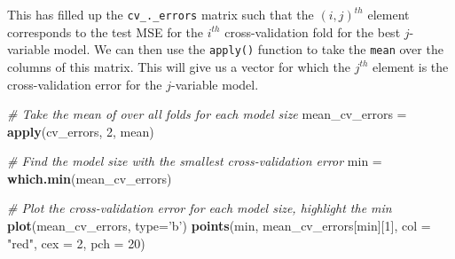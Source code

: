 \documentclass[
]{article}
\newenvironment{Shaded}{\begin{snugshade}}{\end{snugshade}}
\newcommand{\CommentTok}[1]{\textcolor[rgb]{0.56,0.35,0.01}{\textit{#1}}}
\newcommand{\ControlFlowTok}[1]{\textcolor[rgb]{0.13,0.29,0.53}{\textbf{#1}}}
\newcommand{\DataTypeTok}[1]{\textcolor[rgb]{0.13,0.29,0.53}{#1}}
\newcommand{\DecValTok}[1]{\textcolor[rgb]{0.00,0.00,0.81}{#1}}
\newcommand{\KeywordTok}[1]{\textcolor[rgb]{0.13,0.29,0.53}{\textbf{#1}}}
\newcommand{\NormalTok}[1]{#1}
\newcommand{\OperatorTok}[1]{\textcolor[rgb]{0.81,0.36,0.00}{\textbf{#1}}}
\newcommand{\StringTok}[1]{\textcolor[rgb]{0.31,0.60,0.02}{#1}}
\begin{document}
\begin{Shaded}
\end{Shaded}

This has filled up the \texttt{cv\_.\_errors} matrix such that the
\((i,j)^{th}\) element corresponds to the test MSE for the \(i^{th}\)
cross-validation fold for the best \(j\)-variable model. We can then use
the \texttt{apply()} function to take the \texttt{mean} over the columns
of this matrix. This will give us a vector for which the \(j^{th}\)
element is the cross-validation error for the \(j\)-variable model.

\begin{Shaded}
\begin{Highlighting}[]
\CommentTok{# Take the mean of over all folds for each model size}
\NormalTok{mean_cv_errors =}\StringTok{ }\KeywordTok{apply}\NormalTok{(cv_errors, }\DecValTok{2}\NormalTok{, mean)}

\CommentTok{# Find the model size with the smallest cross-validation error}
\NormalTok{min =}\StringTok{ }\KeywordTok{which.min}\NormalTok{(mean_cv_errors)}

\CommentTok{# Plot the cross-validation error for each model size, highlight the min}
\KeywordTok{plot}\NormalTok{(mean_cv_errors, }\DataTypeTok{type=}\StringTok{'b'}\NormalTok{)}
\KeywordTok{points}\NormalTok{(min, mean_cv_errors[min][}\DecValTok{1}\NormalTok{], }\DataTypeTok{col =} \StringTok{"red"}\NormalTok{, }\DataTypeTok{cex =} \DecValTok{2}\NormalTok{, }\DataTypeTok{pch =} \DecValTok{20}\NormalTok{)}
\end{Highlighting}
\end{Shaded}
\end{document}

